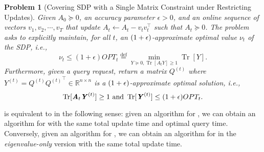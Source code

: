 \documentclass[11pt]{article}
\newcommand{\defeq}{\stackrel{\textup{def}}{=}}
\newtheorem{problem}[theorem]{Problem}
\DeclareMathOperator{\Tr}{Tr}
\let\originalleft\left
\let\originalright\right
\renewcommand{\left}{\mathopen{}\mathclose\bgroup\originalleft}
\renewcommand{\right}{\aftergroup\egroup\originalright}
\def\defeq{\stackrel{\mathrm{def}}{=}}
\newcommand\vv{\boldsymbol{\mathit{v}}}
\renewcommand\AA{\boldsymbol{\mathit{A}}}
\newcommand\QQ{\boldsymbol{\mathit{Q}}}
\newcommand\YY{\boldsymbol{\mathit{Y}}}
\begin{document}
\begin{problem}[Covering SDP with a Single Matrix Constraint under Restricting Updates]\label{prob:dynsdp} Given $\AA_0\succeq 0$, an accuracy parameter $\epsilon>0$, and an online sequence of vectors $\vv_1,\vv_2,\cdots,\vv_T$ that update $\AA_t \gets \AA_t -\vv_t\vv_t^{\top}$ such that $\AA_t\succeq 0$. The problem asks to explicitly maintain, for all $t$, an $(1+\epsilon)$-approximate optimal value $\nu_t$ of the SDP, i.e.,  $$\nu_t \leq (1+\epsilon)OPT_t \defeq {\min}_{\YY\succeq 0, \Tr[\AA_t\YY]\geq 1}  \Tr[\YY].$$
Furthermore, given a query request, return a matrix $\QQ^{(t)}$ where $\YY^{(t)} = \QQ^{(t)}{\QQ^{(t)}}^{\top} \in \mathbb{R}^{n\times n}$ is a $(1+\epsilon)$-approximate optimal solution, i.e., 
    $$\Tr[\AA_t\YY^{(t)}]\geq 1\text{ and }\Tr[\YY^{(t)}]\leq \left(1+\epsilon\right) OPT_t.$$
\end{problem}
 is equivalent to  in the following sense: given an algorithm for , we can obtain an algorithm for  with the same total update time and optimal query time. Conversely, given an algorithm for , we can obtain an algorithm for  in the \emph{eigenvalue-only} version with the same total update time.
\end{document}
